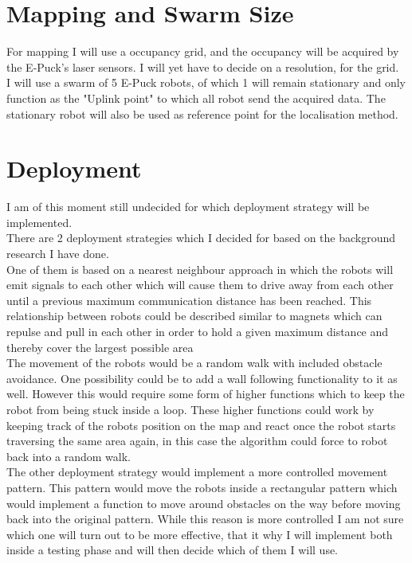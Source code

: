 \section{Mapping and Swarm Size}
For mapping I will use a occupancy grid, and the occupancy will be acquired by the E-Puck's laser sensors. 
I will yet have to decide on a resolution, for the grid.\\
I will use a swarm of 5 E-Puck robots, of which 1 will remain stationary and only function as the "Uplink point" to which all robot send the acquired data. 
The stationary robot will also be used as reference point for the localisation method.

\section{Deployment}
I am of this moment still undecided for which deployment strategy will be implemented. \\
There are 2 deployment strategies which I decided for based on the background research I have done.\\[3ex]

One of them is based on a nearest neighbour approach in which the robots will emit signals to each other which will cause them to drive away from each other until a previous maximum communication distance has been reached. This relationship between robots could be described similar to magnets which can repulse and pull in each other in order to hold a given maximum distance and thereby cover the largest possible area\\
The movement of the robots would be a random walk with included obstacle avoidance. One possibility could be to add a wall following functionality to it as well. However this would require some form of higher functions which to keep the robot from being stuck inside a loop. These higher functions could work by keeping track of the robots position on the map and react once the robot starts traversing the same area again, in this case the algorithm could force to robot back into a random walk.\\[3ex]

The other deployment strategy would implement a more controlled movement pattern. This pattern would move the robots inside a rectangular pattern which would implement a function to move around obstacles on the way before moving back into the original pattern. 
While this reason is more controlled I am not sure which one will turn out to be more effective, that it why I will implement both inside a testing phase and will then decide which of them I will use.